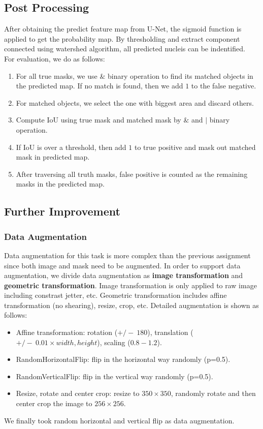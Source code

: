 \documentclass[runningheads]{llncs}
\begin{document}
\subsection{Post Processing}
After obtaining the predict feature map from U-Net, the sigmoid function is applied to get the probability map. By thresholding and extract component connected using watershed algorithm, all predicted nucleis can be indentified. \\
For evaluation, we do as follows:
\begin{enumerate}
	\item For all true masks, we use $\&$ binary operation to find its matched objects in the predicted map. If no match is found, then we add $1$ to the false negative.
	\item For matched objects, we select the one with biggest area and discard others. 
	\item Compute IoU using true mask and matched mask by $\&$ and $|$ binary operation.
	\item If IoU is over a threshold, then add $1$ to true positive and mask out matched mask in predicted map.
	\item After traversing all truth masks, false positive is counted as the remaining masks in the predicted map.
\end{enumerate}

\subsection{Further Improvement}
\subsubsection{Data Augmentation} Data augmentation for this task is more complex than the previous assignment since both image and mask need to be augmented. In order to support data augmentation, we divide data augmentation as \textbf{image transformation} and \textbf{geometric transformation}. Image transformation is only applied to raw image including constrast jetter, etc. Geometric transformation includes affine transformation (no shearing), resize, crop, etc. Detailed augmentation is shown as follows:
\begin{itemize}
    \item Affine transformation: rotation ($+/-\ 180$), translation ($+/-\ 0.01 \times {width, height}$), scaling ($0.8-1.2$). 
    \item RandomHorizontalFlip: flip in the horizontal way randomly (p=0.5).
	\item RandomVerticalFlip: flip in the vertical way randomly (p=0.5).
    \item Resize, rotate and center crop: resize to $350\times 350$, randomly rotate and then center crop the image to $256\times 256$.
\end{itemize}    
We finally took random horizontal and vertical flip as data augmentation.
\end{document}
